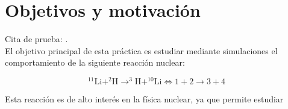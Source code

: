 

\section{Objetivos y motivación}

Cita de prueba: \cite{key}. \\

El objetivo principal de esta práctica es estudiar mediante simulaciones el comportamiento de la siguiente reacción nuclear:

\begin{equation}
	^{11}\mathrm{Li}+^2\mathrm{H} \rightarrow ^3\mathrm{H}+^{10}\mathrm{Li} \Longleftrightarrow 1 + 2 \rightarrow 3 + 4
\end{equation}

Esta reacción es de alto interés en la física nuclear, ya que permite estudiar